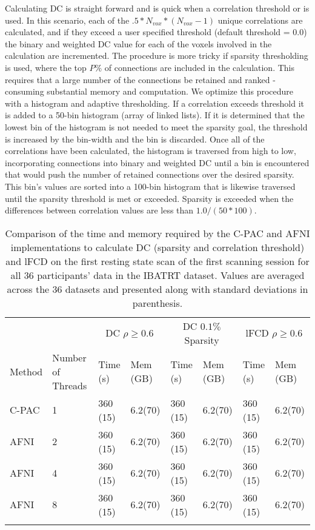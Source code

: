 \documentclass[twocolumn]{bmcart}%
\begin{document}
Calculating DC is straight forward and is quick when a correlation
threshold or is used. In this scenario, each of the
\(.5*N_{vox}*(N_{vox}-1)\) unique correlations are calculated, and if
they exceed a user specified threshold (default threshold = 0.0) the
binary and weighted DC value for each of the voxels involved in the
calculation are incremented. The procedure is more tricky if sparsity
thresholding is used, where the top \(P\%\) of connections are included
in the calculation. This requires that a large number of the connections
be retained and ranked - consuming substantial memory and computation.
We optimize this procedure with a histogram and adaptive thresholding.
If a correlation exceeds threshold it is added to a 50-bin histogram
(array of linked lists). If it is determined that the lowest bin of the
histogram is not needed to meet the sparsity goal, the threshold is
increased by the bin-width and the bin is discarded. Once all of the
correlations have been calculated, the histogram is traversed from high
to low, incorporating connections into binary and weighted DC until a
bin is encountered that would push the number of retained connections
over the desired sparsity. This bin's values are sorted into a 100-bin
histogram that is likewise traversed until the sparsity threshold is met
or exceeded. Sparsity is exceeded when the differences between
correlation values are less than \(1.0/(50*100)\).

\begin{table*}[t!]
\caption{\label{stattable}Comparison of the time and memory required by the C-PAC and AFNI implementations to calculate DC (sparsity and correlation threshold) and lFCD on the first resting state scan of the first scanning session for all 36 participants' data in the IBATRT dataset. Values are averaged across the 36 datasets and presented along with standard deviations in parenthesis.}
\begin{tabular}{l l l l l l l l}
 \hline\noalign{\smallskip}
          &            & \multicolumn{2}{c}{DC $\rho \geq 0.6$} & \multicolumn{2}{c}{DC $0.1\%$ Sparsity} & \multicolumn{2}{c}{lFCD $\rho \geq 0.6$} \\
  Method  & Number of Threads & Time (s)       & Mem (GB)            & Time (s)       & Mem (GB)            & Time (s)       & Mem (GB) \\
    \hline\noalign{\smallskip}
  C-PAC   & 1          & 360 (15)       & 6.2(70)             & 360 (15)       & 6.2(70)             & 360 (15)       & 6.2(70)  \\
  AFNI    & 2          & 360 (15)       & 6.2(70)             & 360 (15)       & 6.2(70)             & 360 (15)       & 6.2(70)  \\
  AFNI    & 4          & 360 (15)       & 6.2(70)             & 360 (15)       & 6.2(70)             & 360 (15)       & 6.2(70)  \\
  AFNI    & 8          & 360 (15)       & 6.2(70)             & 360 (15)       & 6.2(70)             & 360 (15)       & 6.2(70)  \\
  \noalign{\smallskip}\hline
\end{tabular}
\end{table*}
\end{document}
